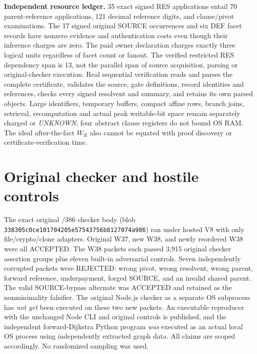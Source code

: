 \documentclass[11pt]{article}
\begin{document}
\noindent\textbf{Independent resource ledger.}
35 exact signed RES applications entail 70 parent-reference applications, 121 decimal reference digits, and clause/pivot examinations. The 17 signed original SOURCE occurrences and six DEF facet records have nonzero evidence and authentication costs even though their inference charges are zero. The paid owner declaration charges exactly three logical units regardless of facet count or fanout. The verified restricted RES dependency span is 13, not the parallel span of source acquisition, parsing or original-checker execution. Real sequential verification reads and parses the complete certificate, validates the source, gate definitions, record identities and references, checks every signed resolvent and summary, and retains its own parsed objects. Large identifiers, temporary buffers, compact affine rows, branch joins, retrieval, recomputation and actual peak writable-bit space remain separately charged or \emph{UNKNOWN}; four abstract clause registers do not bound OS RAM. The ideal after-the-fact $W_R$ also cannot be equated with proof discovery or certificate-verification time.

\section*{Original checker and hostile controls}
The exact original /386 checker body (blob \texttt{338305c0ce101704205e57543756b8127074a986}) ran under hosted V8 with only file/crypto/clone adapters. Original W37, new W38, and newly reordered W38 were all ACCEPTED. The W38 packets each passed 3,915 original checker assertion groups plus eleven built-in adversarial controls. Seven independently corrupted packets were REJECTED: wrong pivot, wrong resolvent, wrong parent, forward reference, underpayment, forged SOURCE, and an invalid shared parent. The valid SOURCE-bypass alternate was ACCEPTED and retained as the nonminimality falsifier. The original Node.js checker as a separate OS subprocess has \emph{not yet} been executed on these two new packets. An executable reproducer with the unchanged Node CLI and original controls is published, and the independent forward-Dijkstra Python program \emph{was} executed as an actual local OS process using independently extracted graph data. All claims are scoped accordingly. No randomized sampling was used.
\end{document}

